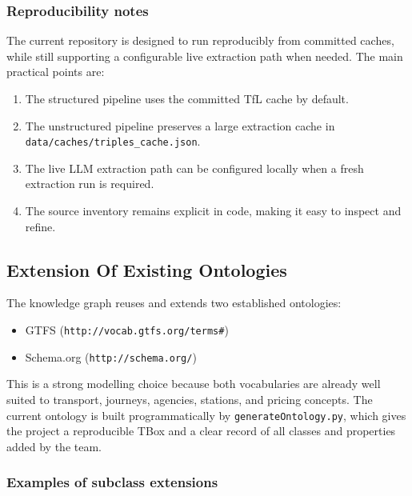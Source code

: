 \documentclass[
  11pt,
  a4paper,
]{article}
\providecommand{\tightlist}{%
  \setlength{\itemsep}{0pt}\setlength{\parskip}{0pt}}
\begin{document}
\subsubsection{Reproducibility notes}\label{reproducibility-notes}

The current repository is designed to run reproducibly from committed
caches, while still supporting a configurable live extraction path when
needed. The main practical points are:

\begin{enumerate}
\def\labelenumi{\arabic{enumi}.}
\tightlist
\item
  The structured pipeline uses the committed TfL cache by default.
\item
  The unstructured pipeline preserves a large extraction cache in
  \texttt{data/caches/triples\_cache.json}.
\item
  The live LLM extraction path can be configured locally when a fresh
  extraction run is required.
\item
  The source inventory remains explicit in code, making it easy to
  inspect and refine.
\end{enumerate}

\subsection{Extension Of Existing
Ontologies}\label{extension-of-existing-ontologies}

The knowledge graph reuses and extends two established ontologies:

\begin{itemize}
\tightlist
\item
  GTFS (\texttt{http://vocab.gtfs.org/terms\#})
\item
  Schema.org (\texttt{http://schema.org/})
\end{itemize}

This is a strong modelling choice because both vocabularies are already
well suited to transport, journeys, agencies, stations, and pricing
concepts. The current ontology is built programmatically by
\texttt{generateOntology.py}, which gives the project a reproducible
TBox and a clear record of all classes and properties added by the team.

\subsubsection{Examples of subclass
extensions}\label{examples-of-subclass-extensions}
\end{document}
